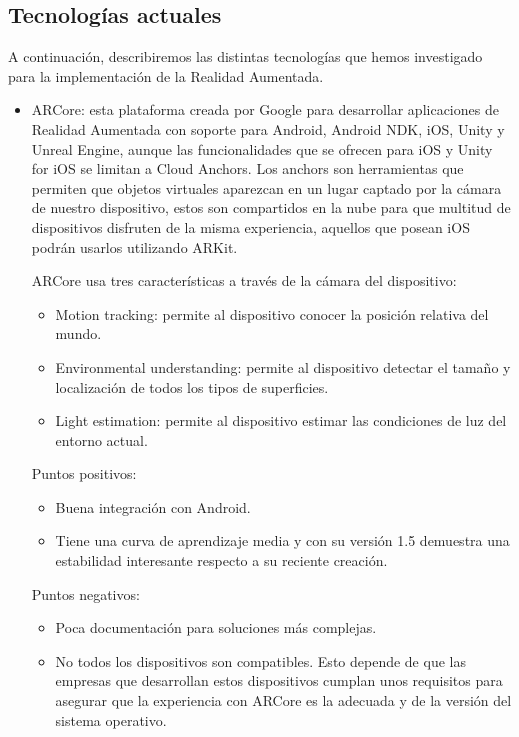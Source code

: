 \subsection{Tecnologías actuales}
\label{makereference2.1.1}
A continuación, describiremos las distintas tecnologías que hemos investigado
 para la implementación de la Realidad Aumentada.
\begin{itemize}
    \item ARCore\cite{arcore}: esta plataforma creada por Google para
    desarrollar aplicaciones de Realidad Aumentada con soporte para Android,
    Android NDK, iOS, Unity y Unreal Engine, aunque las funcionalidades que
    se ofrecen para iOS y Unity for iOS se limitan a Cloud Anchors.
    Los anchors son herramientas que permiten que objetos virtuales
    aparezcan en un lugar captado por la cámara de nuestro dispositivo,
    estos son compartidos en la nube para que multitud de dispositivos
    disfruten de la misma experiencia, aquellos que posean iOS podrán usarlos
    utilizando ARKit.

    ARCore usa tres características a través de la cámara del dispositivo:
    \begin{itemize}  
        \item Motion tracking: permite al dispositivo conocer la posición
        relativa del mundo.
        \item Environmental understanding: permite al dispositivo detectar el
        tamaño y localización de todos los tipos de superficies.
        \item Light estimation: permite al dispositivo estimar las condiciones
        de luz del entorno actual.
    \end{itemize}
    Puntos positivos:
    \begin{itemize}
        \item Buena integración con Android.
        \item Tiene una curva de aprendizaje media y con su versión 1.5
        demuestra una estabilidad interesante respecto a su reciente creación.
    \end{itemize}
    Puntos negativos:
    \begin{itemize}
        \item Poca documentación para soluciones más complejas.
        \item No todos los dispositivos son compatibles.
        Esto depende de que las empresas que desarrollan estos dispositivos
        cumplan unos requisitos para asegurar que la experiencia con ARCore
        es la adecuada y de la versión del sistema operativo.
    \end{itemize}


\end{itemize}
